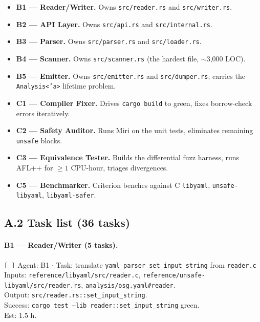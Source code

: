 \documentclass[12pt]{article}
\theoremstyle{definition}
\theoremstyle{remark}
\begin{document}
\begin{itemize}
\item \textbf{B1 --- Reader/Writer.} Owns \texttt{src/reader.rs} and
\texttt{src/writer.rs}.
\item \textbf{B2 --- API Layer.} Owns \texttt{src/api.rs} and
\texttt{src/internal.rs}.
\item \textbf{B3 --- Parser.} Owns \texttt{src/parser.rs} and
\texttt{src/loader.rs}.
\item \textbf{B4 --- Scanner.} Owns \texttt{src/scanner.rs} (the
hardest file, $\sim$3{,}000 LOC).
\item \textbf{B5 --- Emitter.} Owns \texttt{src/emitter.rs} and
\texttt{src/dumper.rs}; carries the \texttt{Analysis<'a>} lifetime
problem.
\item \textbf{C1 --- Compiler Fixer.} Drives \texttt{cargo build} to
green, fixes borrow-check errors iteratively.
\item \textbf{C2 --- Safety Auditor.} Runs Miri on the unit tests,
eliminates remaining \texttt{unsafe} blocks.
\item \textbf{C3 --- Equivalence Tester.} Builds the differential fuzz
harness, runs AFL++ for $\ge 1$ CPU-hour, triages divergences.
\item \textbf{C5 --- Benchmarker.} Criterion benches against C
\texttt{libyaml}, \texttt{unsafe-libyaml}, \texttt{libyaml-safer}.
\end{itemize}

\subsection*{A.2 Task list (36 tasks)}

\paragraph{B1 --- Reader/Writer (5 tasks).}

\begin{flushleft}
\texttt{[\,]} Agent: B1 \(\cdot\) Task: translate
\texttt{yaml\_parser\_set\_input\_string} from \texttt{reader.c}
\\
\quad Inputs: \texttt{reference/libyaml/src/reader.c},
\texttt{reference/unsafe-libyaml/src/reader.rs},
\texttt{analysis/osg.yaml\#reader}.
\\
\quad Output: \texttt{src/reader.rs::set\_input\_string}.
\\
\quad Success: \texttt{cargo test --lib reader::set\_input\_string}
green.
\\
\quad Est: 1.5 h.
\end{flushleft}
\end{document}
